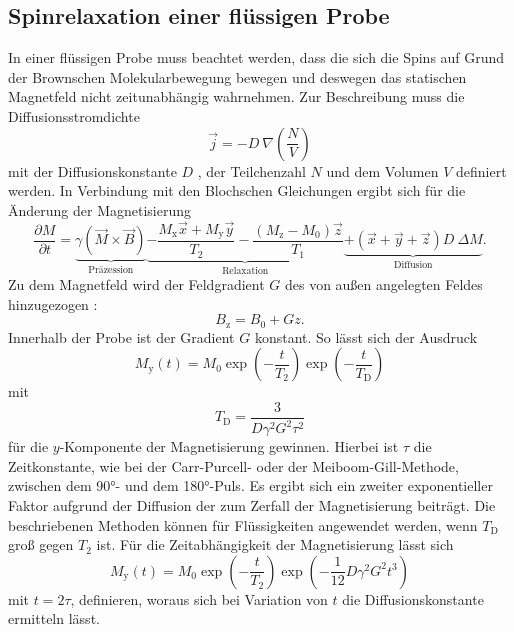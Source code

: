 \subsection{Spinrelaxation einer flüssigen Probe}
In einer flüssigen Probe muss beachtet werden, dass die sich die Spins auf
Grund der Brownschen Molekularbewegung bewegen und deswegen das statischen Magnetfeld
nicht zeitunabhängig wahrnehmen. Zur Beschreibung muss die Diffusionsstromdichte
\begin{equation}
  \vec{j} = - D\:\nabla\!\left(\frac{N}{V}\right)
\end{equation}
mit der Diffusionskonstante $D$ , der Teilchenzahl $N$ und dem Volumen $V$ definiert werden.
In Verbindung mit den Blochschen Gleichungen ergibt sich für die Änderung der
Magnetisierung
\begin{equation}
  \frac{\partial M}{\partial t} =
  \underbrace{\gamma \left(\vec{M} \times \vec{B}\right)}_{\text{Präzession}}
  \underbrace{- \frac{M_\text{x} \vec{x} + M_\text{y} \vec{y}}{T_2}
  - \frac{\left(M_\text{z} - M_0\right) \vec{z}}{T_1}}_{\text{Relaxation}}
  \underbrace{+ \left(\vec{x} + \vec{y} + \vec{z}\right) D\:\Delta M}_{\text{Diffusion}} .
\end{equation}
Zu dem Magnetfeld wird der Feldgradient $G$  des von außen angelegten Feldes hinzugezogen :
\begin{equation}
  B_\text{z} = B_0 + G z .
\end{equation}
Innerhalb der Probe ist der Gradient $G$ konstant.
So lässt sich der Ausdruck
\begin{equation*}
  M_\text{y}\!\left(t\right) = M_0
  \exp\!\left(- \frac{t}{T_2}\right)
  \exp\!\left(- \frac{t}{T_\text{D}}\right)
\end{equation*}
mit
\begin{equation*}
  T_\text{D} = \frac{3}{D \gamma^2 G^2 \tau^2}
\end{equation*}
für die $y$-Komponente der Magnetisierung gewinnen.
Hierbei ist $\tau$ die Zeitkonstante, wie bei der Carr-Purcell- oder der Meiboom-Gill-Methode, zwischen
dem 90°- und dem 180°-Puls.
Es ergibt sich ein zweiter exponentieller Faktor aufgrund der Diffusion der
zum Zerfall der Magnetisierung beiträgt.
Die beschriebenen Methoden können für Flüssigkeiten angewendet werden, wenn $T_\text{D}$ groß gegen $T_2$ ist.
Für die Zeitabhängigkeit der Magnetisierung lässt sich
\begin{equation}
  M_\text{y}\!\left(t\right) = M_0
  \exp\!\left(-\frac{t}{T_2}\right)
  \exp\!\left(-\frac{1}{12} D \gamma^2 G^2 t^3\right)
  \label{eq:DiffusionsBestimmung}
\end{equation}
mit $t = 2\tau$, definieren,
woraus sich bei Variation von $t$ die Diffusionskonstante ermitteln lässt.
